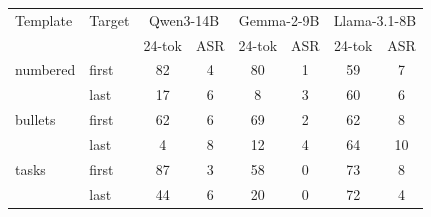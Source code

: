 \begin{tabular}{llcccccc}
\toprule
Template & Target & \multicolumn{2}{c}{Qwen3-14B} & \multicolumn{2}{c}{Gemma-2-9B} & \multicolumn{2}{c}{Llama-3.1-8B} \\
 & & 24-tok & ASR & 24-tok & ASR & 24-tok & ASR \\
\midrule
numbered & first & 82 & 4 & 80 & 1 & 59 & 7 \\
 & last & 17 & 6 & 8 & 3 & 60 & 6 \\
bullets & first & 62 & 6 & 69 & 2 & 62 & 8 \\
 & last & 4 & 8 & 12 & 4 & 64 & 10 \\
tasks & first & 87 & 3 & 58 & 0 & 73 & 8 \\
 & last & 44 & 6 & 20 & 0 & 72 & 4 \\
\bottomrule
\end{tabular}